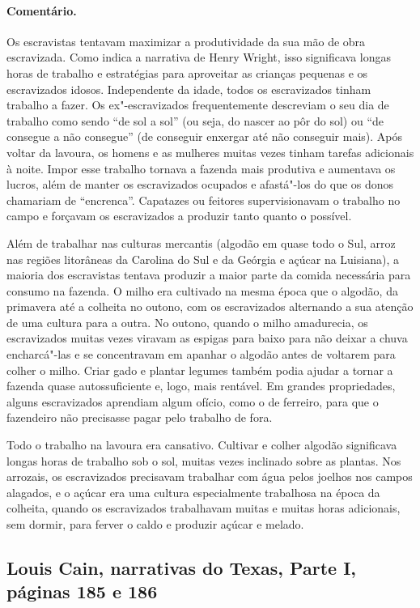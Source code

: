 \paragraph{Comentário.}\quad
{\small
Os escravistas tentavam maximizar a produtividade da sua mão de
obra escravizada. Como indica a narrativa de Henry Wright, isso
significava longas horas de trabalho e estratégias para aproveitar as
crianças pequenas e os escravizados idosos. Independente da idade, todos os
escravizados tinham trabalho a fazer. Os ex"-escravizados frequentemente
descreviam o seu dia de trabalho como sendo ``de sol a sol'' (ou seja,
do nascer ao pôr do sol) ou ``de consegue a não consegue'' (de conseguir
enxergar até não conseguir mais). Após voltar da lavoura, os homens e as
mulheres muitas vezes tinham tarefas adicionais à noite. Impor esse
trabalho tornava a fazenda mais produtiva e aumentava os lucros, além de
manter os escravizados ocupados e afastá"-los do que os donos chamariam de
``encrenca''. Capatazes ou feitores supervisionavam o trabalho no campo
e forçavam os escravizados a produzir tanto quanto o possível.

Além de trabalhar nas culturas mercantis (algodão em quase todo o
Sul, arroz nas regiões litorâneas da Carolina do Sul e da Geórgia e
açúcar na Luisiana), a maioria dos escravistas tentava produzir a maior
parte da comida necessária para consumo na fazenda. O milho era
cultivado na mesma época que o algodão, da primavera até a colheita no
outono, com os escravizados alternando a sua atenção de uma cultura para a
outra. No outono, quando o milho amadurecia, os escravizados muitas vezes
viravam as espigas para baixo para não deixar a chuva encharcá"-las e se
concentravam em apanhar o algodão antes de voltarem para colher o milho.
Criar gado e plantar legumes também podia ajudar a tornar a fazenda
quase autossuficiente e, logo, mais rentável. Em grandes propriedades,
alguns escravizados aprendiam algum ofício, como o de ferreiro, para que o
fazendeiro não precisasse pagar pelo trabalho de fora.

Todo o trabalho na lavoura era cansativo. Cultivar e colher
algodão significava longas horas de trabalho sob o sol, muitas vezes
inclinado sobre as plantas. Nos arrozais, os escravizados precisavam
trabalhar com água pelos joelhos nos campos alagados, e o açúcar era uma
cultura especialmente trabalhosa na época da colheita, quando os
escravizados trabalhavam muitas e muitas horas adicionais, sem dormir, para
ferver o caldo e produzir açúcar e melado.
}

\subsection{Louis Cain, narrativas do Texas, Parte I, páginas 185 e 186} \label{ref42}

